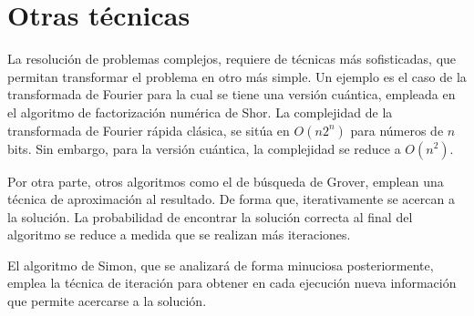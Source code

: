\section{Otras técnicas}

La resolución de problemas complejos, requiere de técnicas más sofisticadas, que 
permitan transformar el problema en otro más simple. Un ejemplo es el caso de la 
transformada de Fourier para la cual se tiene una versión cuántica, empleada en 
el algoritmo de factorización numérica de Shor. La complejidad de la 
transformada de Fourier rápida clásica, se sitúa en $O(n2^n)$ para números de 
$n$ bits.  Sin embargo, para la versión cuántica, la complejidad se reduce a 
$O(n^2)$.

Por otra parte, otros algoritmos como el de búsqueda de Grover, emplean una 
técnica de aproximación al resultado. De forma que, iterativamente se acercan a 
la solución. La probabilidad de encontrar la solución correcta al final del 
algoritmo se reduce a medida que se realizan más iteraciones.

El algoritmo de Simon, que se analizará de forma minuciosa posteriormente, 
emplea la técnica de iteración para obtener en cada ejecución nueva información 
que permite acercarse a la solución.



